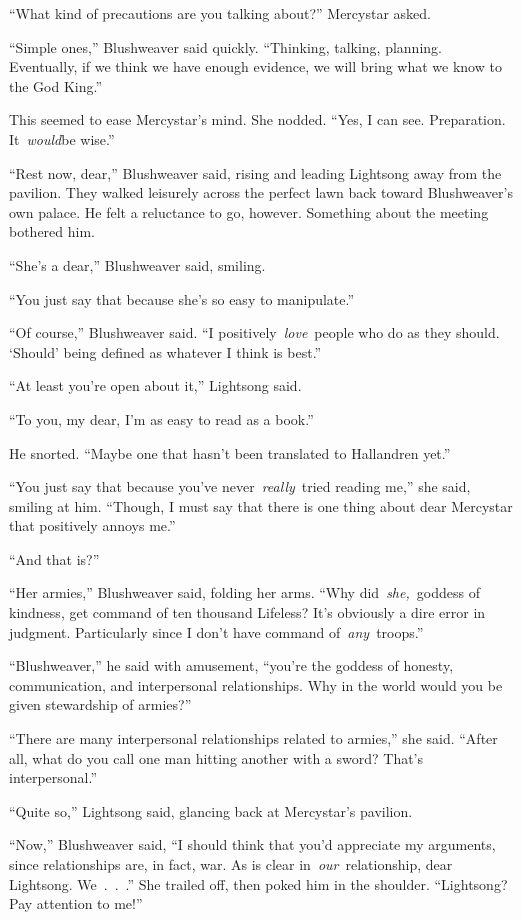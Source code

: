 “What kind of precautions are you talking about?” Mercystar asked.

“Simple ones,” Blushweaver said quickly. “Thinking, talking, planning. Eventually, if we think we have enough evidence, we will bring what we know to the God King.”

This seemed to ease Mercystar’s mind. She nodded. “Yes, I can see. Preparation. It~\textit{would}be wise.”

“Rest now, dear,” Blushweaver said, rising and leading Lightsong away from the pavilion. They walked leisurely across the perfect lawn back toward Blushweaver’s own palace. He felt a reluctance to go, however. Something about the meeting bothered him.

“She’s a dear,” Blushweaver said, smiling.

“You just say that because she’s so easy to manipulate.”

“Of course,” Blushweaver said. “I positively~\textit{love}~people who do as they should. ‘Should’ being defined as whatever I think is best.”

“At least you’re open about it,” Lightsong said.

“To you, my dear, I’m as easy to read as a book.”

He snorted. “Maybe one that hasn’t been translated to Hallandren yet.”

“You just say that because you’ve never~\textit{really}~tried reading me,” she said, smiling at him. “Though, I must say that there is one thing about dear Mercystar that positively annoys me.”

“And that is?”

“Her armies,” Blushweaver said, folding her arms. “Why did~\textit{she,}~goddess of kindness, get command of ten thousand Lifeless? It’s obviously a dire error in judgment. Particularly since I don’t have command of~\textit{any}~troops.”

“Blushweaver,” he said with amusement, “you’re the goddess of honesty, communication, and interpersonal relationships. Why in the world would you be given stewardship of armies?”

“There are many interpersonal relationships related to armies,” she said. “After all, what do you call one man hitting another with a sword? That’s interpersonal.”

“Quite so,” Lightsong said, glancing back at Mercystar’s pavilion.

“Now,” Blushweaver said, “I should think that you’d appreciate my arguments, since relationships are, in fact, war. As is clear in~\textit{our}~relationship, dear Lightsong. We~.~.~.” She trailed off, then poked him in the shoulder. “Lightsong? Pay attention to me!”

